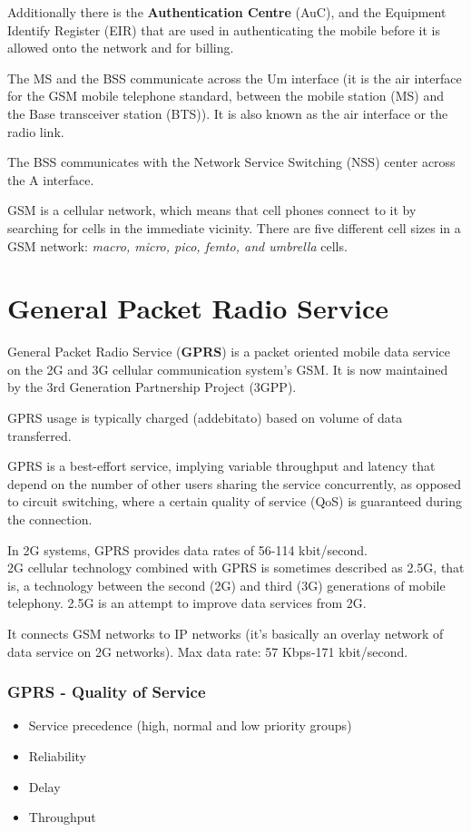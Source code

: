 Additionally there is the \textbf{Authentication Centre} (AuC), and the
Equipment Identify Register (EIR) that are used in authenticating the
mobile before it is allowed onto the network and for billing.

The MS and the BSS communicate across the Um interface (it is the air
interface for the GSM mobile telephone standard, between the mobile station
(MS) and the Base transceiver station (BTS)). It is also known as the air
interface or the radio link.

The BSS communicates with the Network Service Switching (NSS) center across
the A interface.

GSM is a cellular network, which means that cell phones connect to it by
searching for cells in the immediate vicinity. There are five different cell
sizes in a GSM network: \textit{macro, micro, pico, femto, and umbrella} cells.

\section{General Packet Radio Service}
\label{sec:gprs}

General Packet Radio Service (\textbf{GPRS}) is a packet oriented mobile data
service on the 2G and 3G cellular communication system's GSM. It is now
maintained by the 3rd Generation Partnership Project (3GPP).

GPRS usage is typically charged (addebitato) based on volume of data
transferred.

GPRS is a best-effort service, implying variable throughput and latency that
depend on the number of other users sharing the service concurrently, as
opposed to circuit switching, where a certain quality of service (QoS) is
guaranteed during the connection.

In 2G systems, GPRS provides data rates of 56-114 kbit/second. \\

2G cellular technology combined with GPRS is sometimes described as 2.5G,
that is, a technology between the second (2G) and third (3G) generations of
mobile telephony. 2.5G is an attempt to improve data services from
2G.

It connects GSM networks to IP networks (it's basically an overlay network of
data service on 2G networks). Max data rate: 57 Kbps-171 kbit/second.

\subsubsection{GPRS - Quality of Service}
\begin{itemize}
  \item Service precedence (high, normal and low priority groups)
  \item Reliability
  \item Delay
  \item Throughput
\end{itemize}


